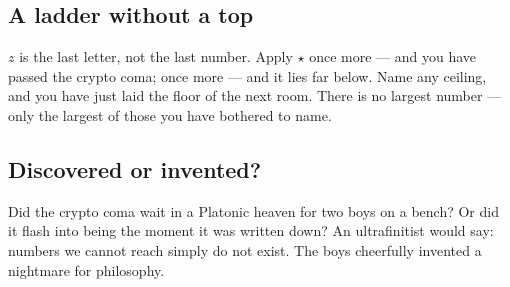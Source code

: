 \subsection{A ladder without a top}
\(z\) is the last letter, not the last number. Apply \(\star\) once more --- and you have
passed the crypto coma; once more --- and it lies far below. Name any ceiling, and you have
just laid the floor of the next room. There is no largest number --- only the largest of
those you have bothered to name.

\subsection{Discovered or invented?}
Did the crypto coma wait in a Platonic heaven for two boys on a bench? Or did it flash into
being the moment it was written down? An ultrafinitist would say: numbers we cannot reach
simply do not exist. The boys cheerfully invented a nightmare for philosophy.
